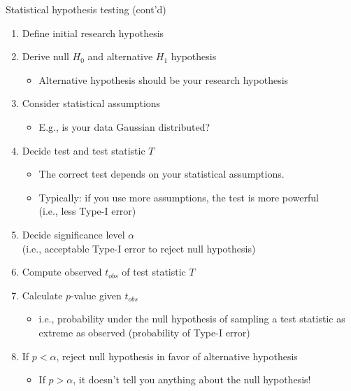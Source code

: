 \begin{frame}[c]{Statistical hypothesis testing (cont'd)}

\begin{enumerate}
\item Define initial research hypothesis
\item Derive null $H_0$ and alternative $H_1$ hypothesis
\begin{itemize}
\item Alternative hypothesis should be your research hypothesis
\end{itemize}
\item Consider statistical assumptions
\begin{itemize}
\item E.g., is your data Gaussian distributed?
\end{itemize}
\pause
\item Decide test and test statistic $T$
\begin{itemize}
\item The correct test depends on your statistical assumptions.
\item Typically: if you use more assumptions, the test is more powerful\\ (i.e., less Type-I error)
\end{itemize}
\pause
\item Decide significance level $\alpha$\\ (i.e., acceptable Type-I error to reject null hypothesis)
\pause
\item Compute observed $t_{obs}$ of test statistic $T$
\item Calculate $p$-value given $t_{obs}$
\begin{itemize}
\item i.e., probability under the null hypothesis of sampling a test statistic as extreme as observed (probability of Type-I error)
\end{itemize} 
\pause
\item If $p < \alpha$, reject null hypothesis in favor of alternative hypothesis
\begin{itemize}
\item If $p > \alpha$, it doesn't tell you anything about the null hypothesis!
\end{itemize}
\end{enumerate}	

\end{frame}
